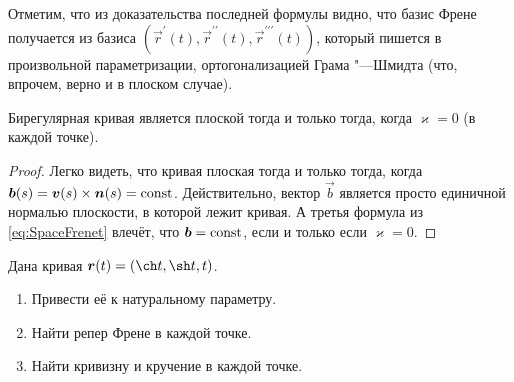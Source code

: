 Отметим, что из доказательства последней формулы видно, что базис Френе получается из базиса $(\vec{r}^\prime(t), \vec{r}^{\prime\prime}(t), \vec{r}^{\prime\prime\prime}(t))$, который пишется в произвольной параметризации, ортогонализацией Грама "---Шмидта (что, впрочем, верно и в плоском случае).

\begin{proposition}
	Бирегулярная кривая является плоской тогда и только тогда, когда $\varkappa = 0$ (в каждой точке).
\end{proposition}

\begin{proof}
	Легко видеть, что кривая плоская тогда и только тогда, когда $\vec{b}(s) \hm= \vec{v}(s) \times \vec{n}(s) = \const$. Действительно, вектор $\vec{b}$ является просто единичной нормалью плоскости, в которой лежит кривая. А третья формула из \eqref{eq:SpaceFrenet} влечёт, что $\boldsymbol{b} = \mathrm{const}$, если и только если $\varkappa = 0$.
\end{proof}

\begin{problem}
	Дана кривая $\vec{r}(t) = (\ch t, \sh t, t)$.
	\begin{enumerate}[nolistsep, label=(\arabic*)]
		\item Привести её к натуральному параметру.
		\item Найти репер Френе в каждой точке.
		\item Найти кривизну и кручение в каждой точке.
	\end{enumerate}
\end{problem}

